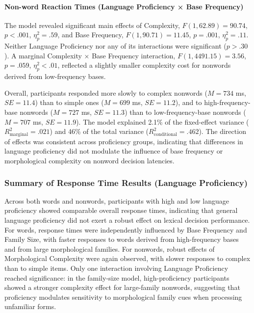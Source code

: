 \documentclass[preprint,12pt, authoryear, review]{elsarticle}
\begin{document}
	\paragraph{Non-word Reaction Times (Language Proficiency × Base Frequency)}
	
	The model revealed significant main effects of Complexity, $F(1, 62.89) = 90.74$, $p < .001$, $\eta_p^2 = .59$, and Base Frequency, $F(1, 90.71) = 11.45$, $p = .001$, $\eta_p^2 = .11$. Neither Language Proficiency nor any of its interactions were significant ($p > .30$). A marginal Complexity × Base Frequency interaction, $F(1, 4491.15) = 3.56$, $p = .059$, $\eta_p^2 < .01$, reflected a slightly smaller complexity cost for nonwords derived from low-frequency bases.
	
	Overall, participants responded more slowly to complex nonwords ($M = 734$ ms, $SE = 11.4$) than to simple ones ($M = 699$ ms, $SE = 11.2$), and to high-frequency-base nonwords ($M = 727$ ms, $SE = 11.3$) than to low-frequency-base nonwords ($M = 707$ ms, $SE = 11.9$). The model explained 2.1\% of the fixed-effect variance ($R^2_{\text{marginal}} = .021$) and 46\% of the total variance ($R^2_{\text{conditional}} = .462$). The direction of effects was consistent across proficiency groups, indicating that differences in language proficiency did not modulate the influence of base frequency or morphological complexity on nonword decision latencies.
	
	\subsubsection{Summary of Response Time Results (Language Proficiency)}
	
	Across both words and nonwords, participants with high and low language proficiency showed comparable overall response times, indicating that general language proficiency did not exert a robust effect on lexical decision performance. For words, response times were independently influenced by Base Frequency and Family Size, with faster responses to words derived from high-frequency bases and from large morphological families. For nonwords, robust effects of Morphological Complexity were again observed, with slower responses to complex than to simple items. Only one interaction involving Language Proficiency reached significance: in the family-size model, high-proficiency participants showed a stronger complexity effect for large-family nonwords, suggesting that proficiency modulates sensitivity to morphological family cues when processing unfamiliar forms. 
	
\end{document}
